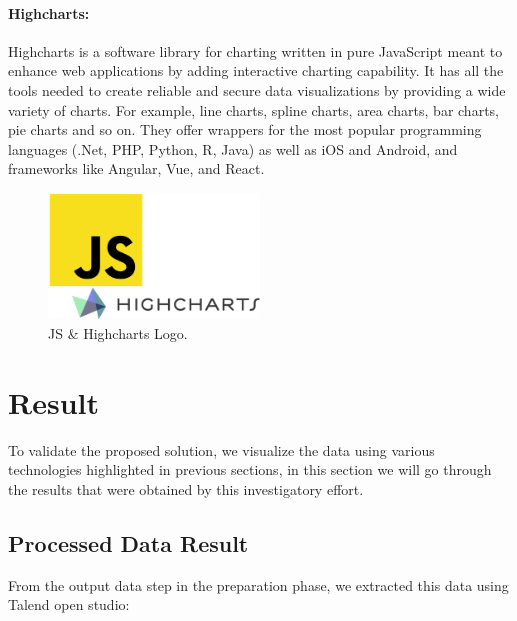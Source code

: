 \paragraph*{Highcharts:}
Highcharts is a software library for charting written in pure JavaScript meant to enhance web applications by adding interactive charting capability. 
It has all the tools needed to create reliable and secure data visualizations by
providing a wide variety of charts. For example, line charts, spline charts, area charts, bar charts, pie charts and so on. They offer wrappers for the most popular programming languages (.Net, PHP, Python, R, Java) as well as iOS and Android, and frameworks like Angular, Vue, and React\cite{InteractiveJavascriptCharts}. 
\begin{figure}[h!]
    \center
    \includegraphics[width=0.50\textwidth]{images/chapter4/jshigh.png}
    \caption{JS \& Highcharts Logo.}
    \label{fig:Highcharts}
\end{figure}

\newpage
\section{Result}
To validate the proposed solution, we visualize the data  using various technologies highlighted in previous sections, in this section we will go through the results that were obtained by this investigatory effort.

\subsection{Processed Data Result}
From the output data step in the preparation phase, we extracted this data using Talend open studio:


\lstset{language=XML}

